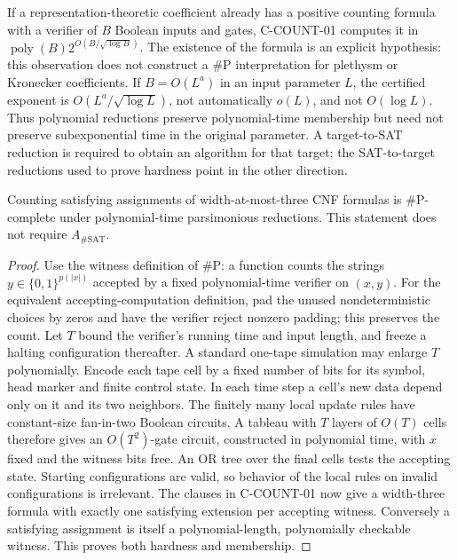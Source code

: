 If a representation-theoretic coefficient already has a positive counting
formula with a verifier of \(B\) Boolean inputs and gates, C-COUNT-01
computes it in \(\operatorname{poly}(B)2^{O(B/\sqrt{\log B})}\).
The existence of the formula is an explicit hypothesis: this observation
does not construct a \(\#\mathrm P\) interpretation for plethysm or
Kronecker coefficients.  If \(B=O(L^a)\) in an input parameter \(L\),
the certified exponent is \(O(L^a/\sqrt{\log L})\), not automatically
\(o(L)\), and not \(O(\log L)\).  Thus polynomial reductions preserve
polynomial-time membership but need not preserve subexponential time
in the original parameter.  A target-to-SAT reduction is required to
obtain an algorithm for that target; the SAT-to-target reductions used
to prove hardness point in the other direction.

\begin{corollary}
Counting satisfying assignments of width-at-most-three CNF formulas is
\(\#\mathrm P\)-complete under polynomial-time parsimonious reductions.
This statement does not require \(A_{\#\mathrm{SAT}}\).
\end{corollary}
\begin{proof}
Use the witness definition of \(\#\mathrm P\): a function counts the
strings \(y\in\{0,1\}^{p(|x|)}\) accepted by a fixed polynomial-time
verifier on \((x,y)\).  For the equivalent accepting-computation
definition, pad the unused nondeterministic choices by zeros and have
the verifier reject nonzero padding; this preserves the count.
Let \(T\) bound the verifier's running time and input length, and freeze a halting
configuration thereafter.  A standard one-tape simulation may enlarge
\(T\) polynomially.  Encode each tape cell by a fixed number of bits
for its symbol, head marker and finite control state.  In each time
step a cell's new data depend only on it and its two neighbors.
The finitely many local update rules have constant-size fan-in-two
Boolean circuits.  A tableau with \(T\) layers of \(O(T)\) cells
therefore gives an \(O(T^2)\)-gate circuit, constructed in polynomial
time, with \(x\) fixed and the witness bits free.  An OR tree over
the final cells tests the accepting state.  Starting configurations
are valid, so behavior of the local rules on invalid configurations
is irrelevant.  The clauses in C-COUNT-01 now give a width-three
formula with exactly one satisfying extension per accepting witness.
Conversely a satisfying assignment is itself a polynomial-length,
polynomially checkable witness.  This proves both hardness and membership.
\end{proof}

